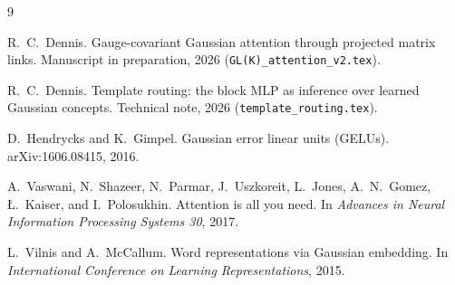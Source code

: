 \documentclass[11pt]{article}
\theoremstyle{definition}
\theoremstyle{remark}
\begin{document}
\begin{thebibliography}{9}

R.~C.~Dennis.
\newblock Gauge-covariant Gaussian attention through projected matrix links.
\newblock Manuscript in preparation, 2026 (\texttt{GL(K)\_attention\_v2.tex}).

R.~C.~Dennis.
\newblock Template routing: the block MLP as inference over learned Gaussian concepts.
\newblock Technical note, 2026 (\texttt{template\_routing.tex}).

D.~Hendrycks and K.~Gimpel.
\newblock Gaussian error linear units ({GELUs}).
\newblock arXiv:1606.08415, 2016.

A.~Vaswani, N.~Shazeer, N.~Parmar, J.~Uszkoreit, L.~Jones, A.~N.~Gomez, {\L}.~Kaiser, and I.~Polosukhin.
\newblock Attention is all you need.
\newblock In \emph{Advances in Neural Information Processing Systems 30}, 2017.

L.~Vilnis and A.~McCallum.
\newblock Word representations via {G}aussian embedding.
\newblock In \emph{International Conference on Learning Representations}, 2015.

\end{thebibliography}
\end{document}
